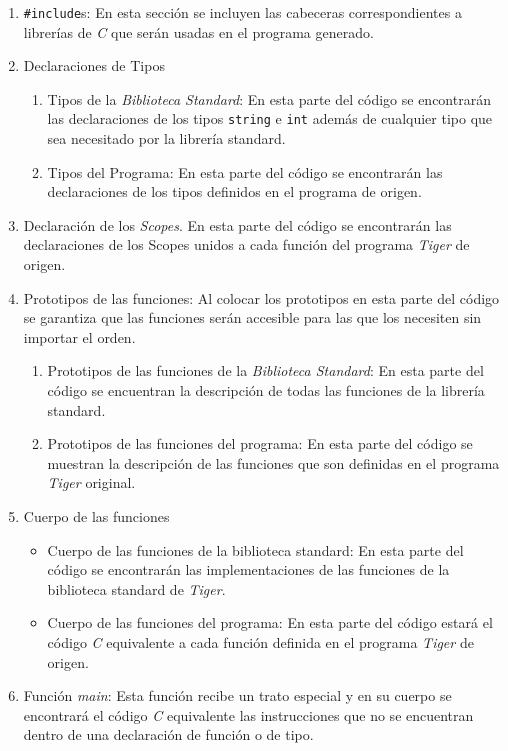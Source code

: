 \documentclass{article}
\begin{document}
\begin{enumerate}
    \item \texttt{\#include}s: En esta sección se incluyen las cabeceras
    correspondientes a librerías de \textit{C} que serán usadas en el programa
    generado.
    \item Declaraciones de Tipos
        \begin{enumerate}
            \item Tipos de la  \textit{Biblioteca Standard}: En esta parte del
            código se encontrarán las declaraciones de los tipos
            \texttt{string} e \texttt{int} además de cualquier tipo que sea
            necesitado por la librería standard.
      		\item Tipos del Programa: En esta parte del código se encontrarán
      		las declaraciones de los tipos definidos en el programa de origen.
  		\end{enumerate}
  	\item Declaración de los \textit{Scopes}. En esta parte del código se
  	encontrarán las declaraciones de los Scopes unidos a cada función del
  	programa \textit{Tiger} de origen.
  	\item Prototipos de las funciones: Al colocar los prototipos en esta parte
  	del código se garantiza que las funciones serán accesible para las que los
  	necesiten sin importar el orden.
        \begin{enumerate}
            \item Prototipos de las funciones de la \textit{Biblioteca
            Standard}: En esta parte del código se encuentran la descripción de
            todas las funciones de la librería standard.
            \item Prototipos de las funciones del programa: En esta parte del
            código se muestran la descripción de las funciones que son
            definidas en el programa \textit{Tiger} original.
        \end{enumerate}
    \item Cuerpo de las funciones
        \begin{itemize}
            \item Cuerpo de las funciones de la biblioteca standard: En esta
            parte del código se encontrarán las implementaciones de las
            funciones de la biblioteca standard de \textit{Tiger}.
            \item Cuerpo de las funciones del programa: En esta parte del código
            estará el código \textit{C} equivalente a cada función definida en
            el programa \textit{Tiger} de origen.
        \end{itemize}
    \item Función \textit{main}: Esta función recibe un trato especial y en su
    cuerpo se encontrará el código \textit{C} equivalente las instrucciones que
    no se encuentran dentro de una declaración de función o de tipo. 
\end{enumerate}
\end{document}
